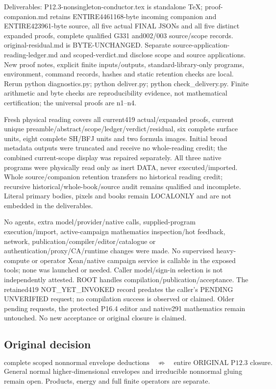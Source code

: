 \documentclass[11pt]{article}
\begin{document}
Deliverables: P12.3-nonsingleton-conductor.tex is standalone TeX; proof-companion.md retains ENTIRE4461168-byte incoming companion and ENTIRE423961-byte source, all five actual FINAL JSONs and all five distinct expanded proofs, complete qualified G331 and002/003 source/scope records. original-residual.md is BYTE-UNCHANGED. Separate source-application-reading-ledger.md and scoped-verdict.md disclose scope and source applications. New proof notes, explicit finite inputs/outputs, standard-library-only programs, environment, command records, hashes and static retention checks are local. Rerun python diagnostics.py; python deliver.py; python check\_delivery.py. Finite arithmetic and byte checks are reproducibility evidence, not mathematical certification; the universal proofs are n1--n4.

Fresh physical reading covers all current419 actual/expanded proofs, current unique preamble/abstract/scope/ledger/verdict/residual, six complete surface units, eight complete SH/BFJ units and two formula images. Initial broad metadata outputs were truncated and receive no whole-reading credit; the combined current-scope display was repaired separately. All three native programs were physically read only as inert DATA, never executed/imported. Whole source/companion retention transfers no historical reading credit; recursive historical/whole-book/source audit remains qualified and incomplete. Literal primary bodies, pixels and books remain LOCALONLY and are not embedded in the deliverables.

No agents, extra model/provider/native calls, supplied-program execution/import, active-campaign mathematics inspection/hot feedback, network, publication/compiler/editor/catalogue or authentication/proxy/CA/runtime changes were made. No supervised heavy-compute or operator Xean/native campaign service is callable in the exposed tools; none was launched or needed. Caller model/sign-in selection is not independently attested. ROOT handles compilation/publication/acceptance. The retained419 NOT\_YET\_INVOKED record predates the caller's PENDING UNVERIFIED request; no compilation success is observed or claimed. Older pending requests, the protected P16.4 editor and native291 mathematics remain untouched. No new acceptance or original closure is claimed.

\subsection*{Original decision}
\[
 \text{complete scoped nonnormal envelope deductions}
 \quad\not\Longrightarrow\quad\text{entire ORIGINAL P12.3 closure}.
\]
General normal higher-dimensional envelopes and irreducible nonnormal
gluing remain open. Products, energy and full finite operators are separate.
\end{document}
